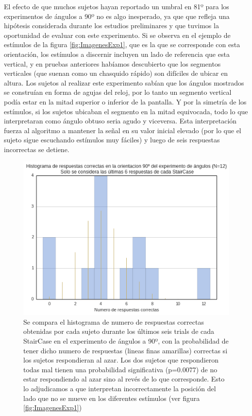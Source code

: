 \documentclass{article}
\begin{document}
    El efecto de que muchos sujetos hayan reportado un umbral en 81º para los experimentos de ángulos a 90º no es algo inesperado, ya que que refleja una hipótesis considerada durante los estudios preliminares y que tuvimos la oportunidad de evaluar con este experimento. Si se observa en el ejemplo de estímulos de la figura \ref{fig:ImagenesExp1}, que es la que se corresponde con esta orientación, los estímulos a discernir incluyen un lado de referencia que esta vertical, y en pruebas anteriores habíamos descubierto que los segmentos verticales (que suenan como un chasquido rápido) son difíciles de ubicar en altura. Los sujetos al realizar este experimento sabían que los ángulos mostrados se construían en forma de agujas del reloj, por lo tanto un segmento vertical podía estar en la mitad superior o inferior de la pantalla. Y por la simetría de los estímulos, si los sujetos ubicaban el segmento en la mitad equivocada, todo lo que interpretaran como ángulo obtuso seria agudo y viceversa. Esta interpretación fuerza al algoritmo a mantener la señal en su valor inicial elevado (por lo que el sujeto sigue escuchando estímulos muy fáciles) y luego de seis respuestas incorrectas se detiene. 
    
    \begin{figure}
        \center
        \includegraphics[width=\textwidth]{Imagenes/Exp1_Saturacion.png}
        \caption{Se compara el histograma de numero de respuestas correctas obtenidas por cada sujeto durante los últimos seis trials de cada StairCase en el experimento de ángulos a 90º, con la probabilidad de tener dicho numero de respuestas (lineas finas amarillas) correctas si los sujetos respondieran al azar. Los dos sujetos que respondieron todas mal tienen una probabilidad significativa (p=0.0077) de no estar respondiendo al azar sino al revés de lo que corresponde. Esto lo adjudicamos a que interpretan incorrectamente la posición del lado que no se mueve en los diferentes estímulos (ver figura \ref{fig:ImagenesExp1})}
        \label{fig:Exp1Saturacion}
    \end{figure}  
    
\end{document}
